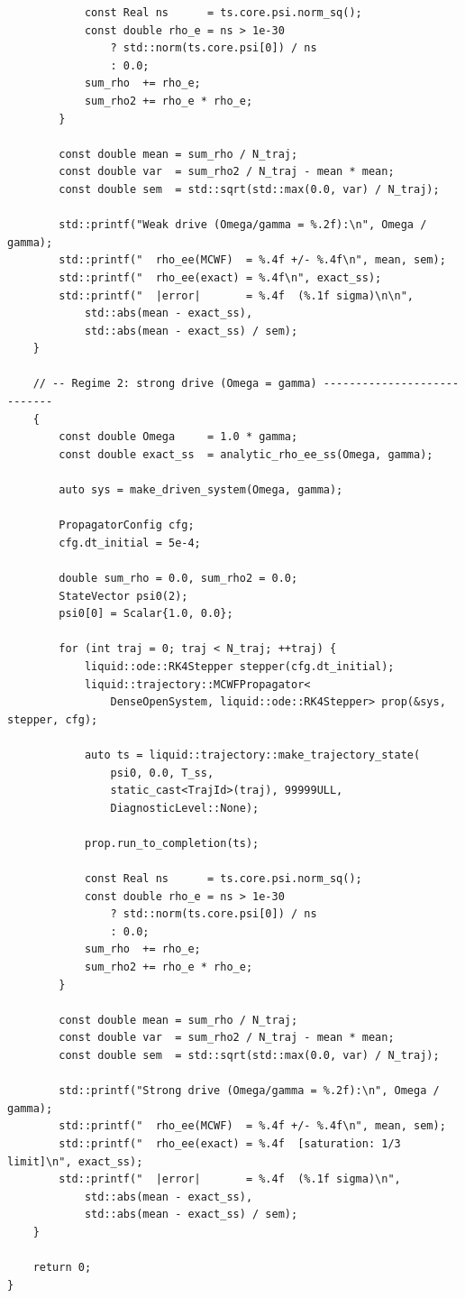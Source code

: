 \documentclass[11pt,a4paper,twoside]{book}
\theoremstyle{definition}
\theoremstyle{remark}
\begin{document}
\begin{verbatim}
            const Real ns      = ts.core.psi.norm_sq();
            const double rho_e = ns > 1e-30
                ? std::norm(ts.core.psi[0]) / ns
                : 0.0;
            sum_rho  += rho_e;
            sum_rho2 += rho_e * rho_e;
        }

        const double mean = sum_rho / N_traj;
        const double var  = sum_rho2 / N_traj - mean * mean;
        const double sem  = std::sqrt(std::max(0.0, var) / N_traj);

        std::printf("Weak drive (Omega/gamma = %.2f):\n", Omega / gamma);
        std::printf("  rho_ee(MCWF)  = %.4f +/- %.4f\n", mean, sem);
        std::printf("  rho_ee(exact) = %.4f\n", exact_ss);
        std::printf("  |error|       = %.4f  (%.1f sigma)\n\n",
            std::abs(mean - exact_ss),
            std::abs(mean - exact_ss) / sem);
    }

    // -- Regime 2: strong drive (Omega = gamma) ----------------------------
    {
        const double Omega     = 1.0 * gamma;
        const double exact_ss  = analytic_rho_ee_ss(Omega, gamma);

        auto sys = make_driven_system(Omega, gamma);

        PropagatorConfig cfg;
        cfg.dt_initial = 5e-4;

        double sum_rho = 0.0, sum_rho2 = 0.0;
        StateVector psi0(2);
        psi0[0] = Scalar{1.0, 0.0};

        for (int traj = 0; traj < N_traj; ++traj) {
            liquid::ode::RK4Stepper stepper(cfg.dt_initial);
            liquid::trajectory::MCWFPropagator<
                DenseOpenSystem, liquid::ode::RK4Stepper> prop(&sys, stepper, cfg);

            auto ts = liquid::trajectory::make_trajectory_state(
                psi0, 0.0, T_ss,
                static_cast<TrajId>(traj), 99999ULL,
                DiagnosticLevel::None);

            prop.run_to_completion(ts);

            const Real ns      = ts.core.psi.norm_sq();
            const double rho_e = ns > 1e-30
                ? std::norm(ts.core.psi[0]) / ns
                : 0.0;
            sum_rho  += rho_e;
            sum_rho2 += rho_e * rho_e;
        }

        const double mean = sum_rho / N_traj;
        const double var  = sum_rho2 / N_traj - mean * mean;
        const double sem  = std::sqrt(std::max(0.0, var) / N_traj);

        std::printf("Strong drive (Omega/gamma = %.2f):\n", Omega / gamma);
        std::printf("  rho_ee(MCWF)  = %.4f +/- %.4f\n", mean, sem);
        std::printf("  rho_ee(exact) = %.4f  [saturation: 1/3 limit]\n", exact_ss);
        std::printf("  |error|       = %.4f  (%.1f sigma)\n",
            std::abs(mean - exact_ss),
            std::abs(mean - exact_ss) / sem);
    }

    return 0;
}
\end{verbatim}
\end{document}

